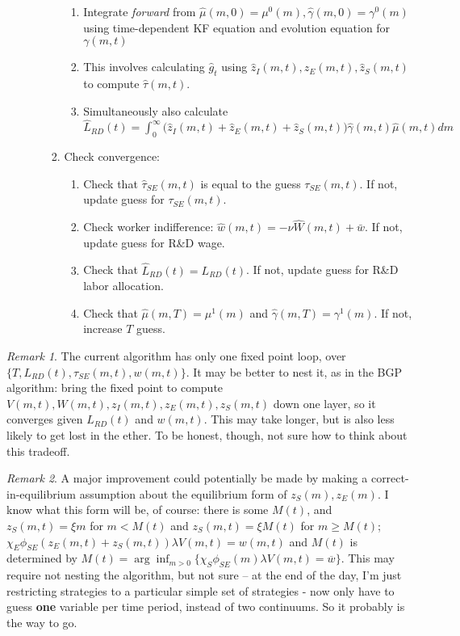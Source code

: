 \documentclass[10pt,english]{article}
\theoremstyle{remark}
\newtheorem{remark}{Remark}
\begin{document}
\begin{enumerate}
\begin{enumerate}
\begin{enumerate}
\begin{enumerate}
				\item Integrate \textit{forward} from $\hat{\mu}(m,0) = \mu^0(m),\hat{\gamma}(m,0) = \gamma^0(m)$ using time-dependent KF equation and evolution equation for $\gamma(m,t)$
				\item This involves calculating $\hat{g}_t$ using $\hat{z}_I(m,t),\hat{z}_E(m,t),\hat{z}_S(m,t)$ to compute $\hat{\tau}(m,t)$.
				\item Simultaneously also calculate $\hat{L}_{RD}(t) = \int_0^{\infty} \Big( \hat{z}_I(m,t) + \hat{z}_E(m,t) + \hat{z}_S(m,t)\Big) \hat{\gamma}(m,t) \hat{\mu}(m,t) dm$
			\end{enumerate}
			\item Check convergence:
			\begin{enumerate}
				\item Check that $\hat{\tau}_{SE}(m,t)$ is equal to the guess $\tau_{SE}(m,t)$. If not, update guess for $\tau_{SE}(m,t)$. 
				\item Check worker indifference: $\hat{w}(m,t) = - \nu \hat{W}(m,t) + \bar{w}$. If not, update guess for R\&D wage.
				\item Check that $\hat{L}_{RD}(t) = L_{RD}(t)$. If not, update guess for R\&D labor allocation.
				\item Check that $\hat{\mu}(m,T) = \mu^1(m)$ and $\hat{\gamma}(m,T) = \gamma^1(m)$. If not, increase $T$ guess. 
			\end{enumerate}
		\end{enumerate}	
	\end{enumerate}
\end{enumerate}

\begin{remark}
	The current algorithm has only one fixed point loop, over $\Big\{T,L_{RD}(t),\tau_{SE}(m,t),w(m,t) \Big\}$. It may be better to nest it, as in the BGP algorithm: bring the fixed point to compute $V(m,t),W(m,t),z_I(m,t),z_E(m,t),z_S(m,t)$ down one layer, so it converges given $L_{RD}(t)$ and $w(m,t)$. This may take longer, but is also less likely to get lost in the ether. To be honest, though, not sure how to think about this tradeoff.
\end{remark}

\begin{remark}
	A major improvement could potentially be made by making a correct-in-equilibrium assumption about the equilibrium form of $z_S(m),z_E(m)$. I know what this form will be, of course: there is some $M(t)$, and $z_S(m,t) = \xi m$ for $m < M(t)$ and $z_S(m,t) = \xi M(t)$ for $m \ge M(t)$; $ \chi_E \phi_{SE} (z_E(m,t) + z_S(m,t)) \lambda V(m,t) = w(m,t)$ and $M(t)$ is determined by $M(t) = \arg \inf_{m > 0} \Big\{ \chi_S \phi_{SE}(m) \lambda V(m,t) = \overline{w} \Big\}$. This may require not nesting the algorithm, but not sure -- at the end of the day, I'm just restricting strategies to a particular simple set of strategies - now only have to guess \textbf{one} variable per time period, instead of two continuums. So it probably is the way to go. 
\end{remark}
	
	
	
	
\end{document}
